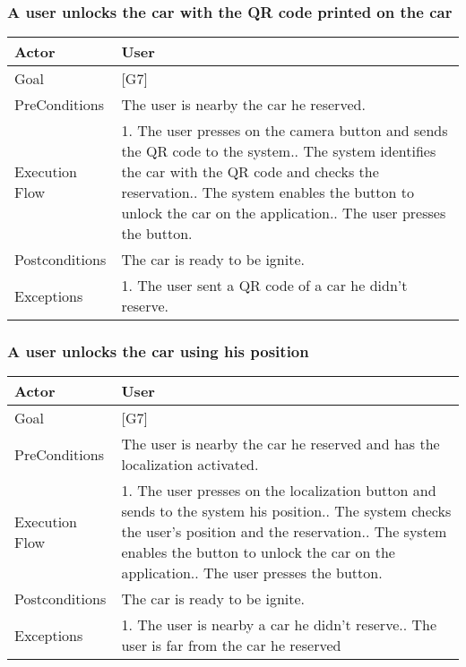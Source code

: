 \documentclass{article}
\begin{document}
	\subsubsection{A user unlocks the car with the QR code printed on the car}
	\begin{tabularx}{\textwidth}{  l  X  }
		\hline
		Actor & User\\
		\hline
		Goal & [G7]\\
		\hline
		PreConditions & The user is nearby the car he reserved.\\
		\hline
		Execution Flow & 1. The user presses on the camera button and sends the QR code to the system.\newline
										 2. The system identifies the car with the QR code and checks the reservation.\newline
										 3. The system enables the button to unlock the car on the application.\newline
										 4. The user presses the button.\\
		\hline
		Postconditions & The car is ready to be ignite.\\
		\hline
		Exceptions & 1. The user sent a QR code of a car he didn't reserve.\\
		\hline
	\end{tabularx}

	\subsubsection{A user unlocks the car using his position}
	\begin{tabularx}{\textwidth}{  l  X  }
		\hline
		Actor & User\\
		\hline
		Goal & [G7]\\
		\hline
		PreConditions & The user is nearby the car he reserved and has the localization activated.\\
		\hline
		Execution Flow & 1. The user presses on the localization button and sends to the system his position.\newline
										 2. The system checks the user's position and the reservation.\newline
										 3. The system enables the button to unlock the car on the application.\newline
										 4. The user presses the button.\\
		\hline
		Postconditions & The car is ready to be ignite.\\
		\hline
		Exceptions & 1. The user is nearby a car he didn't reserve.\newline
								 2. The user is far from the car he reserved\newline\\
		\hline
	\end{tabularx}
\end{document}

